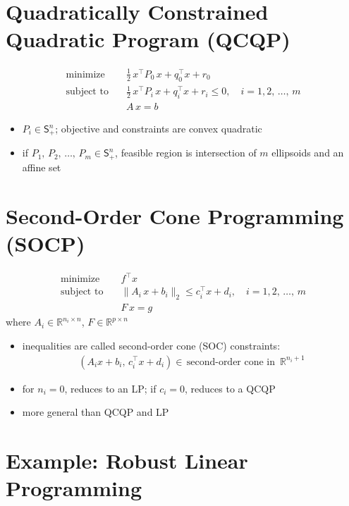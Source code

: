 \documentclass[11pt]{extarticle}
\newcommand{\ds}{\displaystyle}
\theoremstyle{definition}
\begin{document}
\section*{Quadratically Constrained Quadratic Program (QCQP)}
\begin{align*}
  \text{minimize}\quad & \frac{1}{2}\,x^\top P_0\,x + q_0^\top x + r_0 \\
  \text{subject to}\quad & \frac{1}{2}\,x^\top P_i\,x + q_i^\top x + r_i \leqslant 0, \quad i = 1, 2,\,\ldots,\,m \\
  \qquad\qquad &A\,x = b
\end{align*}
\begin{itemize}
  \item $\ds P_i\in\mathsf{S}^n_+$; objective and constraints are convex quadratic 
  \item if $\ds P_1,\,P_2,\,\ldots,\,P_m\in\mathsf{S}^n_+$, feasible region is intersection of $m$ ellipsoids and an affine set  
\end{itemize}

\newpage

\section*{Second-Order Cone Programming (SOCP)}
\begin{align*}
  \text{minimize}\quad & f^\top x \\
  \text{subject to}\quad & \|A_i\,x + b_i\|_2 \leqslant c^\top_i x + d_i, \quad i = 1, 2,\,\ldots,\,m \\
  \qquad\qquad &F\,x = g
\end{align*}
where $A_i\in\mathbb{R}^{n_i\times n}$, $F\in\mathbb{R}^{p\times n}$
\begin{itemize}
  \item inequalities are called second-order cone (SOC) constraints:
    \begin{align*}
      (A_i x + b_i,\,c^\top_i x + d_i)\in\,\text{second-order cone in }\,\mathbb{R}^{n_i + 1}
    \end{align*}
  \item for $n_i = 0$, reduces to an LP; if $c_i = 0$, reduces to a QCQP 
  \item more general than QCQP and LP
\end{itemize}

\newpage

\section*{Example: Robust Linear Programming}
\end{document}
